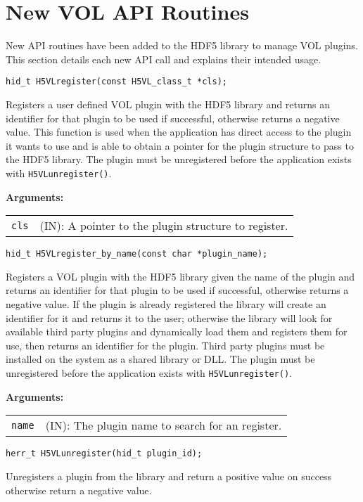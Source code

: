 \section{New VOL API Routines}
\label{sec:api}
New API routines have been added to the HDF5 library to manage VOL plugins. This section details each new API call and explains their intended usage. 

\begin{lstlisting}
hid_t H5VLregister(const H5VL_class_t *cls);
\end{lstlisting}
Registers a user defined VOL plugin with the HDF5 library and returns an identifier for that plugin to be used if successful, otherwise returns a negative value. This function is used when the application has direct access to the plugin it wants to use and is able to obtain a pointer for the plugin structure to pass to the HDF5 library. The plugin must be unregistered before the application exists with {\tt H5VLunregister()}.

\textbf{Arguments:}\\
\begin{tabular}{l p{10cm}}
  {\tt cls} & (IN): A pointer to the plugin structure to register.\\
\end{tabular}

\begin{lstlisting}
hid_t H5VLregister_by_name(const char *plugin_name);
\end{lstlisting}
Registers a VOL plugin with the HDF5 library given the name of the plugin and returns an identifier for that plugin to be used if successful, otherwise returns a negative value. If the plugin is already registered the library will create an identifier for it and returns it to the user; otherwise the library will look for available third party plugins and dynamically load them and registers them for use, then returns an identifier for the plugin. Third party plugins must be installed on the system as a shared library or DLL. The plugin must be unregistered before the application exists with {\tt H5VLunregister()}.

\textbf{Arguments:}\\
\begin{tabular}{l p{10cm}}
  {\tt name} & (IN): The plugin name to search for an register.\\
\end{tabular}

\begin{lstlisting}
herr_t H5VLunregister(hid_t plugin_id);
\end{lstlisting}
Unregisters a plugin from the library and return a positive value on success otherwise return a negative value. 

